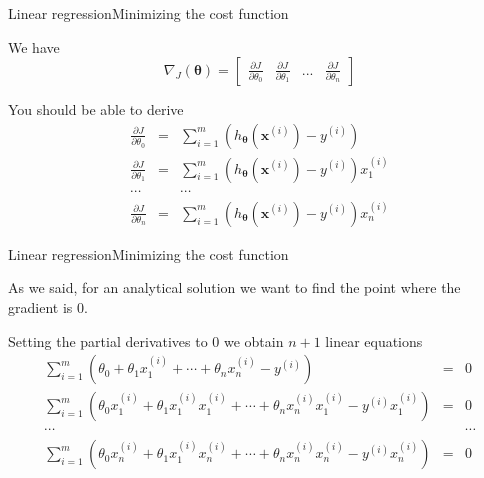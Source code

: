 \documentclass{beamer}
\renewcommand{\vec}[1]{\boldsymbol{#1}}
\begin{document}
\begin{frame}{Linear regression}{Minimizing the cost function}

  We have \[ \nabla_J(\vec{\theta}) = \begin{bmatrix}
    \frac{\partial J}{\partial \theta_0} &
    \frac{\partial J}{\partial \theta_1} &
    ... &
    \frac{\partial J}{\partial \theta_n} \end{bmatrix} \]

  You should be able to derive
  \begin{eqnarray}
    \frac{\partial J}{\partial \theta_0} & = & \sum_{i=1}^m (h_{\vec{\theta}}(\vec{x}^{(i)})-y^{(i)}) \nonumber \\
    \frac{\partial J}{\partial \theta_1} & = & \sum_{i=1}^m (h_{\vec{\theta}}(\vec{x}^{(i)})-y^{(i)}) x_1^{(i)} \nonumber \\
    \cdots & & \cdots \nonumber \\
    \frac{\partial J}{\partial \theta_n} & = & \sum_{i=1}^m (h_{\vec{\theta}}(\vec{x}^{(i)})-y^{(i)}) x_n^{(i)} \nonumber
  \end{eqnarray}

\end{frame}


\begin{frame}{Linear regression}{Minimizing the cost function}

  As we said, for an analytical solution we want to find the point
  where the gradient is 0.

  \medskip

  Setting the partial derivatives to 0 we obtain $n+1$ linear equations
  \begin{eqnarray}
    \sum_{i=1}^m (\theta_0 + \theta_1 x_1^{(i)} + \cdots + \theta_n x_n^{(i)} -y^{(i)}) & = & 0 \nonumber \\
    \sum_{i=1}^m (\theta_0 x_1^{(i)}+ \theta_1 x_1^{(i)}x_1^{(i)} + \cdots + \theta_n x_n^{(i)}x_1^{(i)} -y^{(i)}x_1^{(i)}) & = & 0 \nonumber \\
    \cdots & & \cdots \nonumber \\
    \sum_{i=1}^m (\theta_0 x_n^{(i)}+ \theta_1 x_1^{(i)} x_n^{(i)}+ \cdots + \theta_n x_n^{(i)}x_n^{(i)} -y^{(i)}x_n^{(i)}) & = & 0 \nonumber 
  \end{eqnarray}
  
\end{frame}
\end{document}
